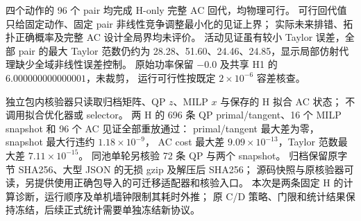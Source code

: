 四个动作的 96 个 pair 均完成 H-only 完整 AC 回代，均物理可行。
可行回代值只给固定动作、固定 pair 非线性竞争调整最小化的见证上界；
实际未来排错、拓扑正确概率及完整 AC 设计全局界均未评价。
活动见证虽有较小 Taylor 误差，全部 pair 的最大 Taylor 范数仍约为
28.28、51.60、24.46、24.85，显示局部仿射代理缺少全域非线性误差控制。
原始功率保留 $-0.0$ 及共享 H1 的 $6.000000000000001$，未裁剪，
运行可行性按既定 $2\times10^{-6}$ 容差核查。

独立包内核验器只读取归档矩阵、QP $z$、MILP $x$ 与保存的 H 拟合 AC 状态；
不调用拟合优化器或 selector。
两 H 的 696 条 QP primal/tangent、16 个 MILP snapshot 和 96 个 AC 见证全部重放通过：
primal/tangent 最大差为零，snapshot 最大行违约 $1.18\times10^{-9}$，
AC cost 最大差 $9.09\times10^{-13}$，Taylor 范数最大差 $7.11\times10^{-15}$。
同池单轮另核验 72 条 QP 与两个 snapshot。
归档保留原字节 SHA256、大型 JSON 的无损 gzip 及解压后 SHA256；
源码快照与原核验器可读，另提供使用正确包导入的可迁移适配器和核验入口。
本次是两条固定 H 的计算诊断，运行顺序及单机墙钟限制其耗时外推；
原 C/D 策略、门限和统计结果保持冻结，后续正式统计需要单独冻结新协议。
